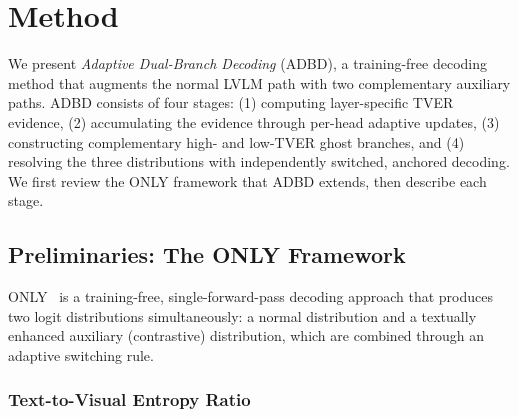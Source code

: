 \section{Method}
\label{sec:method}

We present \emph{Adaptive Dual-Branch Decoding} (ADBD), a training-free decoding method that augments the normal LVLM path with two complementary auxiliary paths. ADBD consists of four stages: (1) computing layer-specific TVER evidence, (2) accumulating the evidence through per-head adaptive updates, (3) constructing complementary high- and low-TVER ghost branches, and (4) resolving the three distributions with independently switched, anchored decoding. We first review the ONLY framework that ADBD extends, then describe each stage.

\subsection{Preliminaries: The ONLY Framework}

ONLY~\cite{wan2025only} is a training-free, single-forward-pass decoding approach that produces two logit distributions simultaneously: a normal distribution and a textually enhanced auxiliary (contrastive) distribution, which are combined through an adaptive switching rule.

\subsubsection{Text-to-Visual Entropy Ratio}

